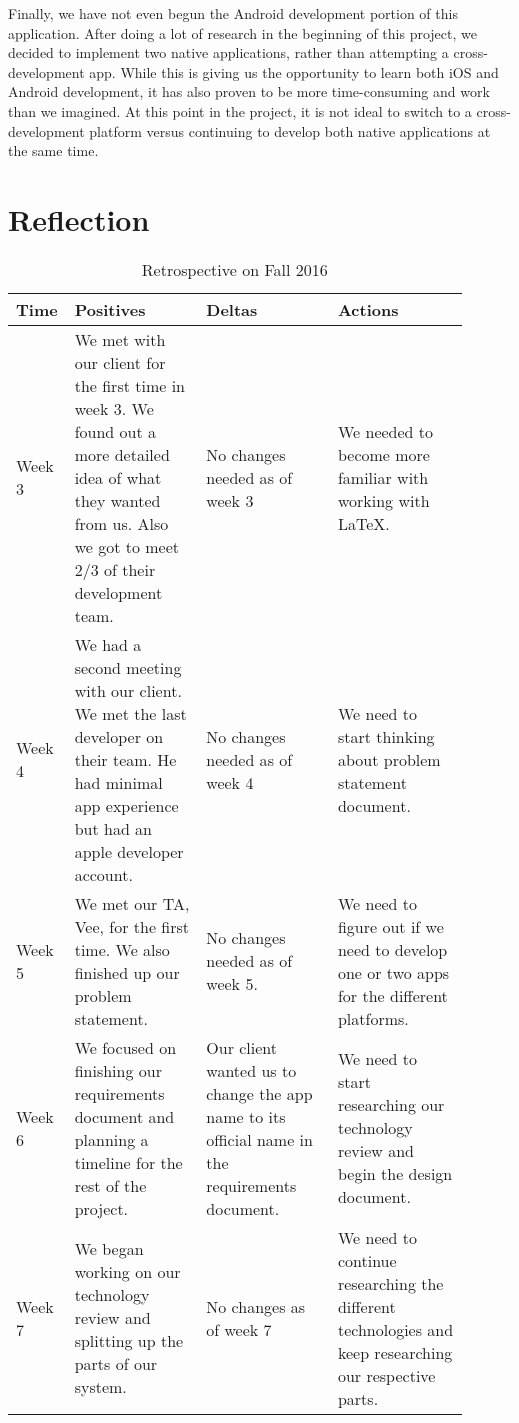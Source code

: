 \documentclass[letterpaper,10pt,draftclsnofoot,onecolumn,titlepage]{IEEEtran}
\begin{document}
		Finally, we have not even begun the Android development portion of this application.
		After doing a lot of research in the beginning of this project, we decided to implement two native applications, rather than attempting a cross-development app.
		While this is giving us the opportunity to learn both iOS and Android development, it has also proven to be more time-consuming and work than we imagined.
		At this point in the project, it is not ideal to switch to a cross-development platform versus continuing to develop both native applications at the same time.



		\section{Reflection}
			\begin{table}[H]
			\caption{Retrospective on Fall 2016}
			\begin{center}
				\begin{tabular}{| p{0.06\linewidth} | p{0.28\linewidth} | p{0.28\linewidth} | p{0.28\linewidth} | }
					\hline
					\textbf{Time} & \textbf{Positives} & \textbf{Deltas} & \textbf{Actions} \\ [0.5ex]
					\hline
					Week 3 & We met with our client for the first time in week 3. We found out a more detailed idea of what they wanted from us. Also we got to meet 2/3 of their development team.  & No changes needed as of week 3 & We needed to become more familiar with working with LaTeX. \\
					\hline
					Week 4 & We had a second meeting with our client. We met the last developer on their team. He had minimal app experience but had an apple developer account. & No changes needed as of week 4 & We need to start thinking about problem statement document. \\
					\hline
					Week 5 & We met our TA, Vee, for the first time. We also finished up our problem statement. & No changes needed as of week 5. & We need to figure out if we need to develop one or two apps for the different platforms. \\
					\hline
					Week 6 & We focused on finishing our requirements document and planning a timeline for the rest of the project. & Our client wanted us to change the app name to its official name in the requirements document. & We need to start researching our technology review and begin the design document. \\
					\hline
					Week 7 & We began working on our technology review and splitting up the parts of our system. & No changes as of week 7 & We need to continue researching the different technologies and keep researching our respective parts. \\

\end{tabular}
\end{center}
\end{table}
\end{document}
